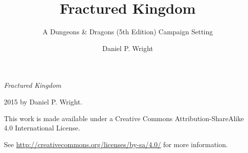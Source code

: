 \documentclass[10pt,twoside,openright,a4paper,twocolumn]{book}
\title{Fractured Kingdom}
\subtitle{A Dungeons \& Dragons (5th Edition) Campaign Setting}
\author{Daniel P. Wright}
\begin{document}

\begin{titlingpage}
\factionstitle
\end{titlingpage}

\frontmatter
{}

\onecolumn
\thispagestyle{empty}
\null\vfill
\begin{flushleft}
\textit{Fractured Kingdom}

{\textcopyright} 2015 by Daniel P. Wright.

\bigskip

{\ccLogo} {\ccAttribution} {\ccShareAlike}

This work is made available under a Creative Commons Attribution-ShareAlike 4.0 International License.

See \url{http://creativecommons.org/licenses/by-sa/4.0/} for more information.
\end{flushleft}
\twocolumn

\cleardoublepage

\tableofcontents

\thispagestyle{empty}

\mainmatter
\end{document}
